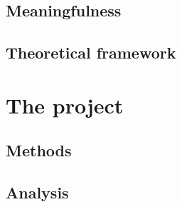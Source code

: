 \documentclass[UKenglish]{ifimaster}
\begin{document}
\chapter{Meaningfulness}

\chapter{Theoretical framework}


\part{The project}
\chapter{Methods}

\chapter{Analysis}


\backmatter{}
\printbibliography
\end{document}
